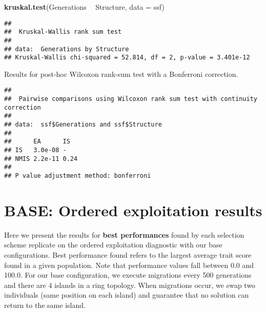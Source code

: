 \documentclass[]{book}
\newenvironment{Shaded}{\begin{snugshade}}{\end{snugshade}}
\newcommand{\DataTypeTok}[1]{\textcolor[rgb]{0.13,0.29,0.53}{#1}}
\newcommand{\KeywordTok}[1]{\textcolor[rgb]{0.13,0.29,0.53}{\textbf{#1}}}
\newcommand{\NormalTok}[1]{#1}
\newcommand{\OperatorTok}[1]{\textcolor[rgb]{0.81,0.36,0.00}{\textbf{#1}}}
\newcommand{\OtherTok}[1]{\textcolor[rgb]{0.56,0.35,0.01}{#1}}
\newcommand{\StringTok}[1]{\textcolor[rgb]{0.31,0.60,0.02}{#1}}
\begin{document}
\begin{Shaded}
\begin{Highlighting}[]
\KeywordTok{kruskal.test}\NormalTok{(Generations }\OperatorTok{~}\StringTok{ }\NormalTok{Structure, }\DataTypeTok{data =}\NormalTok{ ssf)}
\end{Highlighting}
\end{Shaded}

\begin{verbatim}
## 
##  Kruskal-Wallis rank sum test
## 
## data:  Generations by Structure
## Kruskal-Wallis chi-squared = 52.814, df = 2, p-value = 3.401e-12
\end{verbatim}

Results for post-hoc Wilcoxon rank-sum test with a Bonferroni correction.

\begin{Shaded}
\end{Shaded}

\begin{verbatim}
## 
##  Pairwise comparisons using Wilcoxon rank sum test with continuity correction 
## 
## data:  ssf$Generations and ssf$Structure 
## 
##      EA      IS  
## IS   3.0e-08 -   
## NMIS 2.2e-11 0.24
## 
## P value adjustment method: bonferroni
\end{verbatim}

\hypertarget{base-ordered-exploitation-results}{%
\chapter{BASE: Ordered exploitation results}\label{base-ordered-exploitation-results}}

Here we present the results for \textbf{best performances} found by each selection scheme replicate on the ordered exploitation diagnostic with our base configurations.
Best performance found refers to the largest average trait score found in a given population.
Note that performance values fall between 0.0 and 100.0.
For our base configuration, we execute migrations every 500 generations and there are 4 islands in a ring topology.
When migrations occur, we swap two individuals (same position on each island) and guarantee that no solution can return to the same island.
\end{document}
